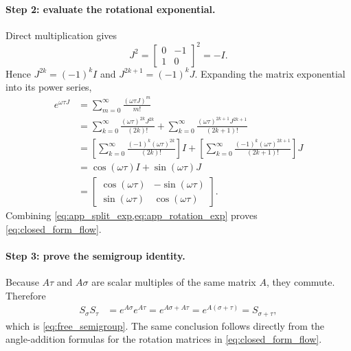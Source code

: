 \documentclass{article}
\theoremstyle{plain}
\theoremstyle{definition}
\theoremstyle{remark}
\begin{document}
\paragraph{Step 2: evaluate the rotational exponential.}
Direct multiplication gives
\begin{equation}
J^2=
\begin{bmatrix}
0&-1\\1&0
\end{bmatrix}^2
=-I.
\end{equation}
Hence $J^{2k}=(-1)^kI$ and $J^{2k+1}=(-1)^kJ$. Expanding the matrix exponential into its power series,
\begin{align}
e^{\omega\tau J}
&=\sum_{m=0}^{\infty}\frac{(\omega\tau J)^m}{m!}
\nonumber\\
&=\sum_{k=0}^{\infty}\frac{(\omega\tau)^{2k}J^{2k}}{(2k)!}
 +\sum_{k=0}^{\infty}\frac{(\omega\tau)^{2k+1}J^{2k+1}}{(2k+1)!}
\nonumber\\
&=\left[\sum_{k=0}^{\infty}\frac{(-1)^k(\omega\tau)^{2k}}{(2k)!}\right]I
 +\left[\sum_{k=0}^{\infty}\frac{(-1)^k(\omega\tau)^{2k+1}}{(2k+1)!}\right]J
\nonumber\\
&=\cos(\omega\tau)I+\sin(\omega\tau)J
\nonumber\\
&=
\begin{bmatrix}
\cos(\omega\tau)&-\sin(\omega\tau)\\
\sin(\omega\tau)&\cos(\omega\tau)
\end{bmatrix}.
\label{eq:app_rotation_exp}
\end{align}
Combining \cref{eq:app_split_exp,eq:app_rotation_exp} proves \cref{eq:closed_form_flow}.

\paragraph{Step 3: prove the semigroup identity.}
Because $A\tau$ and $A\sigma$ are scalar multiples of the same matrix $A$, they commute. Therefore
\begin{align}
S_{\sigma}S_{\tau}
&=e^{A\sigma}e^{A\tau}
=e^{A\sigma+A\tau}
=e^{A(\sigma+\tau)}
=S_{\sigma+\tau},
\end{align}
which is \cref{eq:free_semigroup}. The same conclusion follows directly from the angle-addition formulas for the rotation matrices in \cref{eq:closed_form_flow}.
\end{document}
